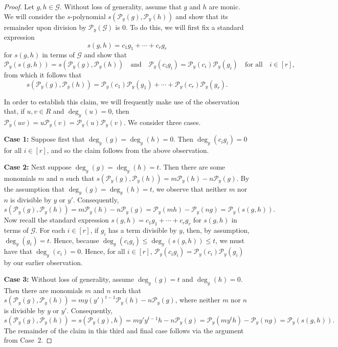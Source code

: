 \documentclass[10pt,a4paper]{amsart}
\newcommand{\G}{\mathcal{G}}
\renewcommand{\P}{\mathcal{P}}
\newcommand{\qand}{\quad \mbox{and} \quad}
\newcommand{\qforall}{\quad \mbox{for all} \quad}
\begin{document}
\begin{proof}
Let $g,h\in \G$. Without loss of generality, assume that $g$ and $h$ are monic.  We will consider the $s$-polynomial $s(\P_y(g),\P_y(h))$ and show that its remainder upon division by $\P_y (\G)$ is $0$.  To do this, we will first fix a standard expression \[
s(g,h) = c_1g_1+\cdots+c_rg_r 
\] for $s(g,h)$ in terms of $\G$ and show that \[
\P_y(s(g, h)) = 
s(\P_y(g),\P_y(h)) 
\qand 
\P_y(c_i g_i) = 
\P_y(c_i)\P_y(g_i) \qforall i \in [r],
\] from which it follows that \[ s(\P_y(g),\P_y(h))=\P_y(c_1)\P_y(g_1)+\cdots+\P_y(c_r)\P_y(g_r).
\]

In order to establish this claim, we will frequently make use of the observation that, if $u, v \in R$ and $\deg_y(u)=0$, then $\P_y(uv) = u \P_y(v) = \P_y(u)\P_y(v)$.  We consider three cases.

\noindent \textbf{Case 1:} Suppose first that $\deg_y(g) = \deg_y(h) = 0$. Then $\deg_y(c_ig_i) = 0$ for all $i \in [r]$, and so the claim follows from the above observation.



\noindent \textbf{Case 2:} Next suppose $\deg_y(g) = \deg_y(h) = t$. 
Then there are some monomials $m$ and $n$ such that 
$s(\P_y(g),\P_y(h)) = m\P_y(h) - n\P_y(g)$. 
By the assumption that $\deg_y(g) = \deg_y(h) = t$, we observe that neither $m$ nor $n$ is divisible by $y$ or $y'$. 
Consequently, 
\[
    s(\P_y(g),\P_y(h)) = m\P_y(h) - n\P_y(g)
     = \P_y(mh) - \P_y(ng)   = \P_y(s(g,h)).
\]
Now recall the standard expression
$s(g,h) = c_1g_1+\cdots + c_rg_r$ for $s(g,h)$ in terms of $\G$.
For each $i \in [r]$, if $g_i$ has a term divisible by $y$, then, by assumption, $\deg_y(g_i) = t$. Hence, because $\deg_y(c_ig_i) \leq \deg_y (s(g,h))\leq t$, we must have that $\deg_y(c_i) = 0$. 
Hence, for all $i \in [r]$, $\P_y(c_ig_i) = \P_y(c_i)\P_y(g_i)$ by our earlier observation. 

\noindent \textbf{Case 3:} Without loss of generality, assume $\deg_y(g) = t$ and $\deg_y(h) = 0$.
    Then there are monomials $m$ and $n$ such that 
$s(\P_y(g),\P_y(h)) = my(y')^{t-1}\P_y(h) - n\P_y(g)$,
where neither $m$ nor $n$ is divisible by $y$ or $y'$. Consequently, 
\[
    s(\P_y(g),\P_y(h)) = s(\P_y(g),h)= my'y^{t-1}h - n\P_y(g)
     = \P_y(my^t h) - \P_y(ng)   = \P_y(s(g,h)).
\]
The remainder of the claim in this third and final case follows via the argument from Case~2.


\end{proof}
\end{document}
